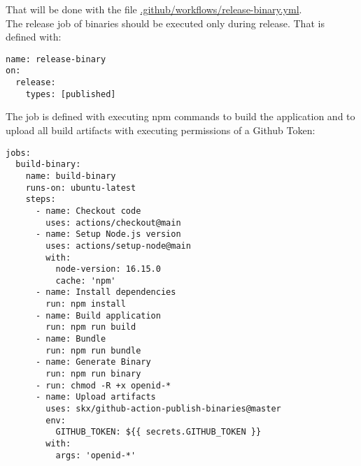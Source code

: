 \documentclass[english, letterpaper, 10 pt]{report}
\begin{document}
\noindent That will be done with the file \href{https://github.com/amosproj/amos2022ss08-openid-connect-doctor/blob/main/.github/workflows/release-binary.yml}{.github/workflows/release-binary.yml}.
\\
\noindent The release job of binaries should be executed only during release. That is defined with:
\begin{lstlisting}[frame=single]
name: release-binary
on:
  release:
    types: [published]
\end{lstlisting}

\newpage
\noindent The job is defined with executing npm commands to build the application and to upload all build artifacts with executing permissions of a Github Token:
\begin{lstlisting}[frame=single]
jobs:
  build-binary:
    name: build-binary
    runs-on: ubuntu-latest
    steps:
      - name: Checkout code
        uses: actions/checkout@main
      - name: Setup Node.js version
        uses: actions/setup-node@main
        with:
          node-version: 16.15.0
          cache: 'npm'
      - name: Install dependencies
        run: npm install
      - name: Build application
        run: npm run build
      - name: Bundle
        run: npm run bundle
      - name: Generate Binary
        run: npm run binary
      - run: chmod -R +x openid-*
      - name: Upload artifacts
        uses: skx/github-action-publish-binaries@master
        env:
          GITHUB_TOKEN: ${{ secrets.GITHUB_TOKEN }}
        with:
          args: 'openid-*'
\end{lstlisting}



\newpage
%

\end{document}
